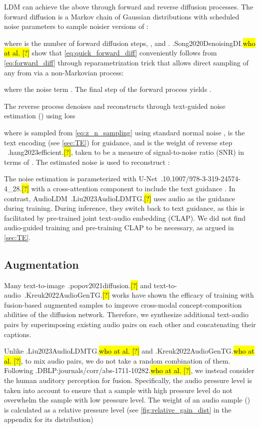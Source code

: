 \documentclass{article}
\let\realcite\cite
\renewcommand{\cite}[1]{\ifx.#1.\hl{[?]}\else\realcite{#1}\fi}
\let\realcitet\citet
\renewcommand{\citet}[1]{\ifx.#1.\hl{who at al. [?]}\else\realcitet{#1}\fi}
\begin{document}
LDM can achieve the above through forward and reverse diffusion processes. The forward diffusion is a Markov chain of Gaussian distributions with scheduled noise parameters  to sample noisier versions of :

where  is the number of forward diffusion steps, , and . \citet{Song2020DenoisingDI} show that \cref{eq:quick_forward_diff} conveniently follows from \cref{eq:forward_diff} through reparametrization trick that allows direct sampling of any  from  via a non-Markovian process: 

where the noise term . The final step of the forward process yields .

The reverse process denoises and reconstructs  through text-guided noise estimation () using loss

where  is sampled from \cref{eq:z_n_sampling} using standard normal noise ,  is the text encoding (see \cref{sec:TE}) for guidance, and  is the weight of reverse step ~\cite{hang2023efficient}, taken to be a measure of signal-to-noise ratio (SNR) in terms of . The estimated noise is used to reconstruct :

The noise estimation  is parameterized with U-Net~\cite{10.1007/978-3-319-24574-4_28} with a cross-attention component to include the text guidance . In contrast, AudioLDM~\cite{Liu2023AudioLDMTG} uses audio as the guidance during training. During inference, they switch back to text guidance, as this is facilitated by pre-trained joint text-audio embedding (CLAP). We did not find audio-guided training and pre-training CLAP to be necessary, as argued in \cref{sec:TE}.

\subsection{Augmentation}
\label{sec:augmentation}
Many text-to-image~\cite{popov2021diffusion} and text-to-audio~\cite{Kreuk2022AudioGenTG} works have shown the efficacy of training with fusion-based augmented samples to improve cross-modal concept-composition abilities of the diffusion network. Therefore, we synthesize additional text-audio pairs by superimposing existing audio pairs on each other and concatenating their captions.

Unlike \citet{Liu2023AudioLDMTG} and \citet{Kreuk2022AudioGenTG}, to mix audio pairs, we do not take a random combination of them. Following \citet{DBLP:journals/corr/abs-1711-10282}, we instead consider the human auditory perception for fusion. Specifically, the audio pressure level  is taken into account to ensure that a sample with high pressure level do not overwhelm the sample with low pressure level. The weight of an audio sample () is calculated as a relative pressure level (see \cref{fig:relative_gain_dist} in the appendix for its distribution)
\end{document}
